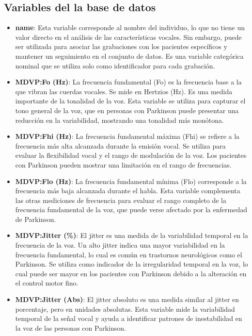 \documentclass[listof=nochaptergap,12pt,times,authoryear]{report}
\begin{document}
\subsection{Variables del la base de datos}
\begin{itemize}
    \item \textbf{name}: Esta variable corresponde al nombre del individuo, lo que no tiene un valor directo en el análisis de las características vocales. Sin embargo, puede ser utilizada para asociar las grabaciones con los pacientes específicos y mantener un seguimiento en el conjunto de datos. Es una variable categórica nominal que se utiliza solo como identificador para cada grabación.
    
    \item \textbf{MDVP:Fo (Hz)}: La frecuencia fundamental (Fo) es la frecuencia base a la que vibran las cuerdas vocales. Se mide en Hertzios (Hz). Es una medida importante de la tonalidad de la voz. Esta variable se utiliza para capturar el tono general de la voz, que en personas con Parkinson puede presentar una reducción en la variabilidad, mostrando una tonalidad más monótona.
    
    \item \textbf{MDVP:Fhi (Hz)}: La frecuencia fundamental máxima (Fhi) se refiere a la frecuencia más alta alcanzada durante la emisión vocal. Se utiliza para evaluar la flexibilidad vocal y el rango de modulación de la voz. Los pacientes con Parkinson pueden mostrar una limitación en el rango de frecuencias.
    
    \item \textbf{MDVP:Flo (Hz)}: La frecuencia fundamental mínima (Flo) corresponde a la frecuencia más baja alcanzada durante el habla. Esta variable complementa las otras mediciones de frecuencia para evaluar el rango completo de la frecuencia fundamental de la voz, que puede verse afectado por la enfermedad de Parkinson.
    
    \item \textbf{MDVP:Jitter (\%)}: El jitter es una medida de la variabilidad temporal en la frecuencia de la voz. Un alto jitter indica una mayor variabilidad en la frecuencia fundamental, lo cual es común en trastornos neurológicos como el Parkinson. Se utiliza como indicador de la irregularidad temporal en la voz, lo cual puede ser mayor en los pacientes con Parkinson debido a la alteración en el control motor fino.
    
    \item \textbf{MDVP:Jitter (Abs)}: El jitter absoluto es una medida similar al jitter en porcentaje, pero en unidades absolutas. Esta variable mide la variabilidad temporal de la señal vocal y ayuda a identificar patrones de inestabilidad en la voz de las personas con Parkinson.
    

\end{itemize}
\end{document}
